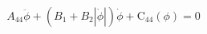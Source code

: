 \begin{equation} \label{eq:roll_decay_equation_himeno_quadratic}
A_{44} \ddot{\phi} + \left(B_{1} + B_{2} \left|{\dot{\phi}}\right|\right) \dot{\phi} + \operatorname{C_{44}}\left(\phi\right) = 0
\end{equation}
